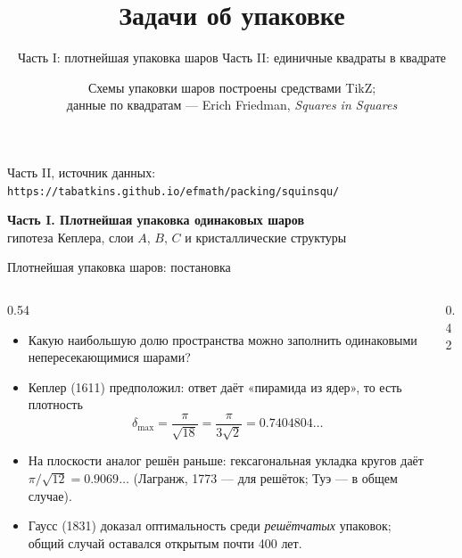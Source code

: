 \documentclass[aspectratio=169,10pt]{beamer}
\title{Задачи об упаковке}
\subtitle{Часть I: плотнейшая упаковка шаров \quad\textbullet\quad Часть II: единичные квадраты в квадрате}
\author{Схемы упаковки шаров построены средствами TikZ;\\ данные по квадратам — Erich Friedman, \emph{Squares in Squares}}
\date{}
\begin{document}
\begin{frame}[plain]
  \titlepage
  \vspace{-1em}
  \begin{center}\footnotesize\color{cMuted}
  Часть II, источник данных: \texttt{https://tabatkins.github.io/efmath/packing/squinsqu/}
  \end{center}
\end{frame}

\begin{frame}[plain]
\vfill
\centering
{\Large\bfseries Часть I. Плотнейшая упаковка одинаковых шаров}\\[6pt]
{\color{cMuted}\small гипотеза Кеплера, слои $A$, $B$, $C$ и кристаллические структуры}
\vfill
\end{frame}


\begin{frame}{Плотнейшая упаковка шаров: постановка}
\small
\begin{columns}[T,onlytextwidth]
\begin{column}{0.54\textwidth}
\begin{itemize}\itemsep3pt
  \item Какую наибольшую долю пространства можно заполнить одинаковыми непересекающимися шарами?
  \item Кеплер (1611) предположил: ответ даёт «пирамида из ядер», то есть плотность
  \[ \delta_{\max} = \frac{\pi}{\sqrt{18}} = \frac{\pi}{3\sqrt2} = 0.7404804\ldots \]
  \item На плоскости аналог решён раньше: гексагональная укладка кругов даёт
  $\pi/\sqrt{12} = 0.9069\ldots$ (Лагранж, 1773 — для решёток; Туэ — в общем случае).
  \item Гаусс (1831) доказал оптимальность среди \emph{решётчатых} упаковок; общий случай оставался открытым почти 400 лет.
\end{itemize}
\end{column}
\begin{column}{0.42\textwidth}
\vspace{0.3em}
\centering
{}
\end{column}
\end{columns}
\end{frame}
\end{document}
